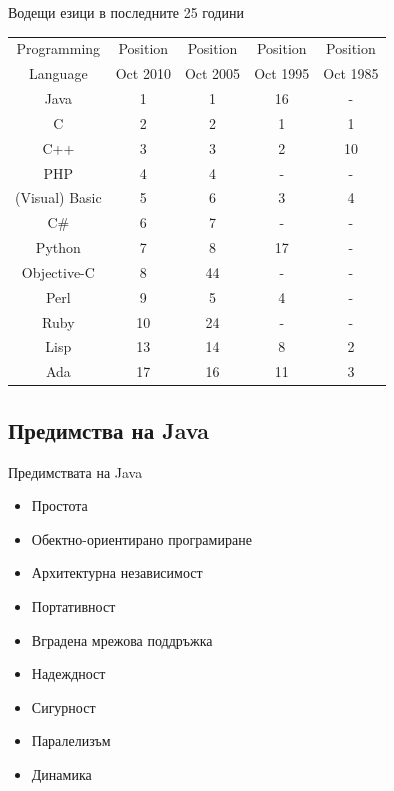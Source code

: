 \documentclass{beamer}
\begin{document}
\begin{frame}{Водещи езици в последните 25 години}
  \transdissolve
  \begin{tabular}{|c|c|c|c|c|}
    \hline
    Programming & Position & Position & Position & Position \\
    Language    & Oct 2010 & Oct 2005 & Oct 1995 & Oct 1985 \\
    \hline
    \hline
    Java        & 1        & 1        & 16       & -        \\
    \hline
    C           & 2        & 2        & 1        & 1        \\
    \hline
    C++         & 3        & 3        & 2        & 10       \\
    \hline
    PHP         & 4        & 4        & -        & -        \\
    \hline   
    (Visual) Basic & 5     & 6        & 3        & 4        \\
    \hline
    C\#         & 6        & 7        & -        & -        \\
    \hline
    Python      & 7        & 8        & 17       & -        \\
    \hline
    Objective-C & 8        & 44       & -        & -        \\
    \hline
    Perl        & 9        & 5        & 4        & -        \\
    \hline      
    Ruby        & 10       & 24       & -        & -        \\
    \hline 
    Lisp        & 13       & 14       & 8        & 2        \\
    \hline
    Ada         & 17       & 16       & 11       & 3        \\
    \hline
  \end{tabular}
\end{frame}

\subsection{Предимства на Java}
\begin{frame}{Предимствата на Java}
  \transdissolve
  \begin{itemize}
  \item Простота \pause
  \item Обектно-ориентирано програмиране \pause
  \item Архитектурна независимост \pause
  \item Портативност \pause
  \item Вградена мрежова поддръжка \pause
  \item Надеждност \pause
  \item Сигурност \pause
  \item Паралелизъм \pause
  \item Динамика
  \end{itemize}
\end{frame}
\end{document}
